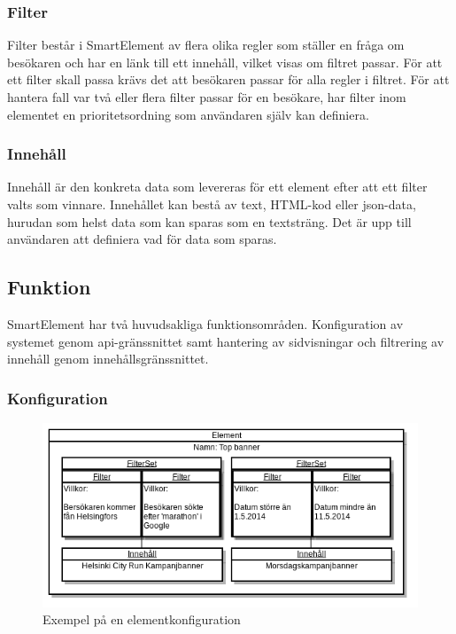 \subsubsection{Filter}

Filter består i SmartElement av flera olika regler som ställer en fråga om besökaren och har en länk till ett innehåll, vilket visas om filtret passar. För att ett filter skall passa krävs det att besökaren passar för alla regler i filtret. För att hantera fall var två eller flera filter passar för en besökare, har filter inom elementet en prioritetsordning som användaren själv kan definiera.

\subsubsection{Innehåll}

Innehåll är den konkreta data som levereras för ett element efter att ett filter valts som vinnare. Innehållet kan bestå av text, HTML-kod eller \gls{json}-data, hurudan som helst data som kan sparas som en textsträng. Det är upp till användaren att definiera vad för data som sparas.

\subsection{Funktion}

SmartElement har två huvudsakliga funktionsområden. Konfiguration av systemet genom \gls{api}-gränssnittet samt hantering av sidvisningar och filtrering av innehåll genom innehållsgränssnittet.

\subsubsection{Konfiguration}

\begin{figure}[h!]
\centering
\includegraphics[width=150mm]{assets/images/smelementelement.png}
\caption{Exempel på en elementkonfiguration}
\label{smelementelement}
\end{figure}

